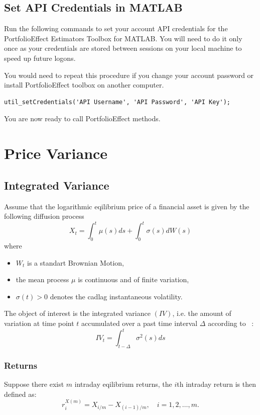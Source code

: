 \documentclass[letterpaper]{report}
\begin{document}
\section{Set API Credentials in MATLAB} 
Run the following commands to set your account API credentials for the
PortfolioEffect Estimators Toolbox for MATLAB.
You will need to do it only once as your credentials are stored between sessions
on your local machine to speed up future logons. \par You would need to repeat
this procedure if you change your account password or install PortfolioEffect
toolbox on another computer.
\begin{lstlisting}
util_setCredentials('API Username', 'API Password', 'API Key');
\end{lstlisting}
You are now ready to call PortfolioEffect methods.


\chapter{Price Variance}
\section{Integrated Variance}
Assume that the logarithmic eqilibrium price of a financial asset is given by the following
diffusion process
\begin{equation}
X_t = \int_0^t \mu(s)ds + \int_0^t \sigma(s)dW(s)
\end{equation}
where

\begin{itemize}
\item $W_t$ is a standart Brownian Motion,
\item the mean process $\mu$ is continuous and of finite variation,
\item $\sigma(t) >0$ denotes the cadlag instantaneous volatility.
\end{itemize}
\noindent The object of interest is the integrated variance $(IV)$, i.e. the
amount of variation at time point $t$ accumulated over a past time interval
$\Delta$ according to ~\cite[Pigorsch et al.]{Pigorsch_Pigorsch_Popov}:
\begin{equation}
IV_t = \int_{t-\Delta}^t \sigma^2(s)ds
\end{equation}
\subsection{Returns}
Suppose there exist $m$ intraday eqilibrium returns, the $i$th intraday return is
then defined as:
\begin{equation}
r_i^{X(m)}= X_{i/m} - X_{(i-1)/m}, \quad i = 1,2,\ldots,m.
\end{equation}
\end{document}
